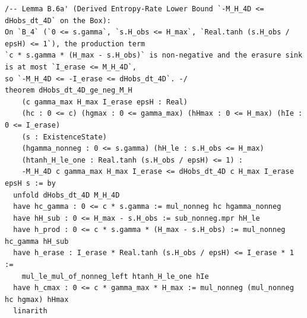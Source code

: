\documentclass[11pt,a4paper]{article}
\theoremstyle{definition}
\begin{document}
\begin{lstlisting}[language=Lean4]
/-- Lemma B.6a' (Derived Entropy-Rate Lower Bound `-M_H_4D <= dHobs_dt_4D` on the Box):
On `B_4` (`0 <= s.gamma`, `s.H_obs <= H_max`, `Real.tanh (s.H_obs / epsH) <= 1`), the production term
`c * s.gamma * (H_max - s.H_obs)` is non-negative and the erasure sink is at most `I_erase <= M_H_4D`,
so `-M_H_4D <= -I_erase <= dHobs_dt_4D`. -/
theorem dHobs_dt_4D_ge_neg_M_H
    (c gamma_max H_max I_erase epsH : Real)
    (hc : 0 <= c) (hgmax : 0 <= gamma_max) (hHmax : 0 <= H_max) (hIe : 0 <= I_erase)
    (s : ExistenceState)
    (hgamma_nonneg : 0 <= s.gamma) (hH_le : s.H_obs <= H_max)
    (htanh_H_le_one : Real.tanh (s.H_obs / epsH) <= 1) :
    -M_H_4D c gamma_max H_max I_erase <= dHobs_dt_4D c H_max I_erase epsH s := by
  unfold dHobs_dt_4D M_H_4D
  have hc_gamma : 0 <= c * s.gamma := mul_nonneg hc hgamma_nonneg
  have hH_sub : 0 <= H_max - s.H_obs := sub_nonneg.mpr hH_le
  have h_prod : 0 <= c * s.gamma * (H_max - s.H_obs) := mul_nonneg hc_gamma hH_sub
  have h_erase : I_erase * Real.tanh (s.H_obs / epsH) <= I_erase * 1 :=
    mul_le_mul_of_nonneg_left htanh_H_le_one hIe
  have h_cmax : 0 <= c * gamma_max * H_max := mul_nonneg (mul_nonneg hc hgmax) hHmax
  linarith


\end{lstlisting}
\end{document}
